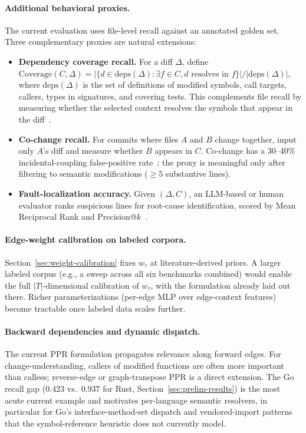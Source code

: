 \documentclass[11pt, a4paper]{article}
\begin{document}
\paragraph{Additional behavioral proxies.} The current evaluation uses file-level recall against an annotated golden set. Three complementary proxies are natural extensions:
\begin{itemize}
    \item \textbf{Dependency coverage recall.} For a diff $\Delta$, define $\mathrm{Coverage}(C, \Delta) = |\{d \in \mathrm{deps}(\Delta) : \exists f \in C, d \text{ resolves in } f\}| / |\mathrm{deps}(\Delta)|$, where $\mathrm{deps}(\Delta)$ is the set of definitions of modified symbols, call targets, callers, types in signatures, and covering tests. This complements file recall by measuring whether the selected context resolves the symbols that appear in the diff~\cite{parnin2011automated}.
    \item \textbf{Co-change recall.} For commits where files $A$ and $B$ change together, input only $A$'s diff and measure whether $B$ appears in $C$. Co-change has a 30--40\% incidental-coupling false-positive rate~\cite{hassan2004predicting}; the proxy is meaningful only after filtering to semantic modifications ($\geq 5$ substantive lines).
    \item \textbf{Fault-localization accuracy.} Given $(\Delta, C)$, an LLM-based or human evaluator ranks suspicious lines for root-cause identification, scored by Mean Reciprocal Rank and Precision@$k$~\cite{parnin2011automated}.
\end{itemize}

\paragraph{Edge-weight calibration on labeled corpora.} Section~\ref{sec:weight-calibration} fixes $w_\tau$ at literature-derived priors. A larger labeled corpus (e.g., a sweep across all six benchmarks combined) would enable the full $|T|$-dimensional calibration of $w_\tau$, with the formulation already laid out there. Richer parameterizations (per-edge MLP over edge-context features) become tractable once labeled data scales further.

\paragraph{Backward dependencies and dynamic dispatch.} The current PPR formulation propagates relevance along forward edges. For change-understanding, callers of modified functions are often more important than callees; reverse-edge or graph-transpose PPR is a direct extension. The Go recall gap ($0.423$ vs.\ $0.937$ for Rust, Section~\ref{sec:prelim-results}) is the most acute current example and motivates per-language semantic resolvers, in particular for Go's interface-method-set dispatch and vendored-import patterns that the symbol-reference heuristic does not currently model.
\end{document}
